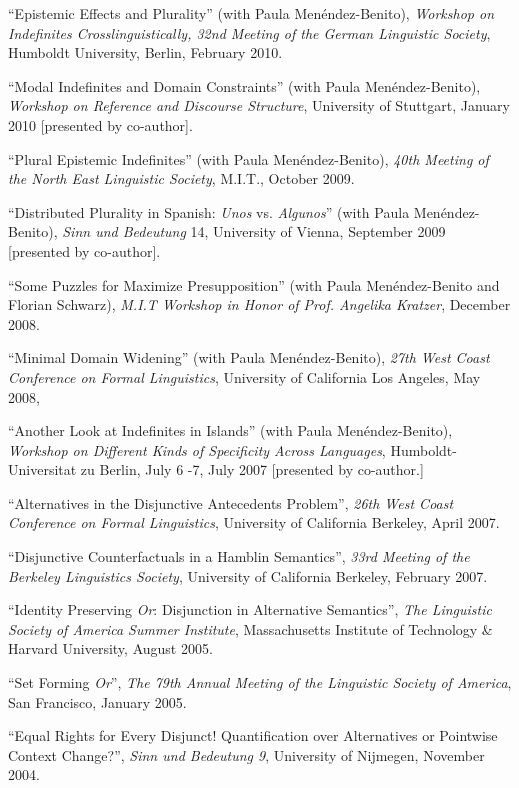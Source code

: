 \documentclass[11pt]{article}
\begin{document}
``Epistemic Effects and Plurality'' (with Paula
Men\'endez-Benito), \textit{Workshop on Indefinites
  Crosslinguistically, 32nd Meeting of the German Linguistic Society},
Humboldt University, Berlin, February 2010.

``Modal Indefinites and Domain Constraints'' (with Paula
Men\'endez-Benito), \textit{Workshop on Reference and Discourse
  Structure}, University of Stuttgart, January 2010 [presented by co-author].

``Plural Epistemic Indefinites'' (with Paula Men\'endez-Benito), \textit{40th
  Meeting of the North East Linguistic Society}, M.I.T., October 2009.

``Distributed Plurality in Spanish: \textit{Unos} vs. \textit{Algunos}''  (with Paula Men\'endez-Benito), \textit{Sinn und Bedeutung} 14, University of Vienna, September 2009 [presented by co-author].

``Some Puzzles for Maximize Presupposition'' (with
  Paula Men\'endez-Benito and Florian Schwarz), \textit{M.I.T Workshop in
  Honor of Prof. Angelika Kratzer}, December 2008.

``Minimal Domain Widening'' (with Paula Men\'endez-Benito), \textit{27th West Coast Conference on
  Formal Linguistics}, University of California Los Angeles, May 2008, 

``Another Look at Indefinites in Islands'' (with Paula
  Men\'endez-Benito), \textit{Workshop on Different Kinds of Specificity
  Across Languages}, Humboldt-Universitat zu Berlin, July 6
  -7, July 2007 [presented by co-author.]

``Alternatives in the Disjunctive Antecedents Problem'', \textit{26th West Coast Conference on Formal Linguistics}, University of California Berkeley, April 2007.


``Disjunctive Counterfactuals in a Hamblin Semantics'', \textit{33rd Meeting of the Berkeley Linguistics Society}, University of California Berkeley, February 2007. 

``Identity Preserving \textit{Or}: Disjunction in Alternative Semantics'', \textit{The Linguistic Society of America Summer Institute}, Massachusetts Institute of Technology \& Harvard University, August 2005. 

``Set Forming \textit{Or}'', \textit{The 79th Annual Meeting of the Linguistic Society of America}, San Francisco, January 2005. 

``Equal Rights for Every Disjunct! Quantification over Alternatives or Pointwise Context Change?'', \textit{Sinn und Bedeutung 9}, University of Nijmegen, November 2004. 
\end{document}
